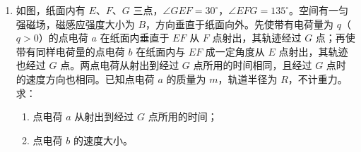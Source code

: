 \documentclass[\gkver]{gaokaozhenti}
\begin{document}
\begin{enumerate}
{设物体动能减少 $\Delta E_k$ 时，在斜坡上运动的距离为 $s$，由动能定理可得

$\Delta E_k=(mg\sin\alpha+f)s$ ②

$\Delta E=fs$ ③

联立①②③式并带入数据可得：

$a=6\Umsq$ ④

（2）设物体沿斜坡向上运动的最大距离为 $s_m$，由运动学规律可得

$s_m=\frac{v_0^2}{2a}$ ⑤

设物体返回底端时的动能为 $E_k$，由动能定理有

$E_k=(mg\sin\alpha-f)s_m$ ⑥

联立①④⑤⑥式并代入数据可得

$E_k=80\UJ$ ⑦
}

\item
如图，纸面内有 $E$、$F$、$G$ 三点，$\angle GEF=30^\circ$，$\angle EFG=135^\circ$。空间有一匀强磁场，磁感应强度大小为 $B$，方向垂直于纸面向外。先使带有电荷量为 $q$（$q>0$）的点电荷 $a$ 在纸面内垂直于 $EF$ 从 $F$ 点射出，其轨迹经过 $G$ 点；再使带有同样电荷量的点电荷 $b$ 在纸面内与 $EF$ 成一定角度从 $E$ 点射出，其轨迹也经过 $G$ 点。两点电荷从射出到经过 $G$ 点所用的时间相同，且经过 $G$ 点时的速度方向也相同。已知点电荷 $a$ 的质量为 $m$，轨道半径为 $R$，不计重力。求：

\begin{enumerate}
	\item
	点电荷 $a$ 从射出到经过 $G$ 点所用的时间；

	\item
	点电荷 $b$ 的速度大小。
\end{enumerate}


\end{enumerate}
\end{document}
